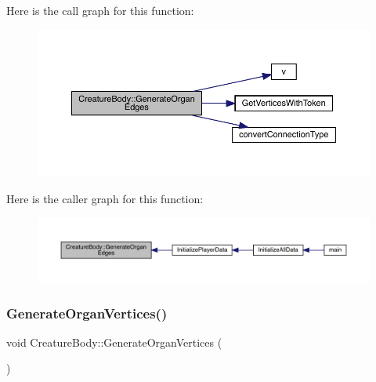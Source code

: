 Here is the call graph for this function\+:
\nopagebreak
\begin{figure}[H]
\begin{center}
\leavevmode
\includegraphics[width=350pt]{da/d7d/class_creature_body_af1303a40606bf06aed980f14e7027d54_cgraph}
\end{center}
\end{figure}
Here is the caller graph for this function\+:
\nopagebreak
\begin{figure}[H]
\begin{center}
\leavevmode
\includegraphics[width=350pt]{da/d7d/class_creature_body_af1303a40606bf06aed980f14e7027d54_icgraph}
\end{center}
\end{figure}
\mbox{\label{class_creature_body_a9cf5cffe6209ed851bf32c2b164d9391}} 
\subsubsection{\texorpdfstring{Generate\+Organ\+Vertices()}{GenerateOrganVertices()}}
{\footnotesize\ttfamily void Creature\+Body\+::\+Generate\+Organ\+Vertices (\begin{DoxyParamCaption}{ }\end{DoxyParamCaption})}


